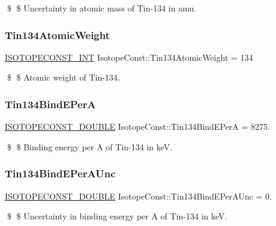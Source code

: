 \$ \$ Uncertainty in atomic mass of Tin-\/134 in amu. \mbox{\label{group___isotope_const-_tin-_sn134_gacfcfd9304071fc2728af19d2c158e5ed}} 
\subsubsection{\texorpdfstring{Tin134\+Atomic\+Weight}{Tin134AtomicWeight}}
{\footnotesize\ttfamily \mbox{\hyperlink{group___isotope_const-_macros_ga5f18360b3e99483a35c32d789e62621c}{I\+S\+O\+T\+O\+P\+E\+C\+O\+N\+S\+T\+\_\+\+I\+NT}} Isotope\+Const\+::\+Tin134\+Atomic\+Weight = 134}

\$ \$ Atomic weight of Tin-\/134. \mbox{\label{group___isotope_const-_tin-_sn134_gae83433bedc83493a04379aaac2d9718a}} 
\subsubsection{\texorpdfstring{Tin134\+Bind\+E\+PerA}{Tin134BindEPerA}}
{\footnotesize\ttfamily \mbox{\hyperlink{group___isotope_const-_macros_ga8f45a7272ce02c0b4c65c44636ed719a}{I\+S\+O\+T\+O\+P\+E\+C\+O\+N\+S\+T\+\_\+\+D\+O\+U\+B\+LE}} Isotope\+Const\+::\+Tin134\+Bind\+E\+PerA = 8275.}

\$ \$ Binding energy per A of Tin-\/134 in keV. \mbox{\label{group___isotope_const-_tin-_sn134_gac34bd6bafd94aa8fcd21242cc8097ba1}} 
\subsubsection{\texorpdfstring{Tin134\+Bind\+E\+Per\+A\+Unc}{Tin134BindEPerAUnc}}
{\footnotesize\ttfamily \mbox{\hyperlink{group___isotope_const-_macros_ga8f45a7272ce02c0b4c65c44636ed719a}{I\+S\+O\+T\+O\+P\+E\+C\+O\+N\+S\+T\+\_\+\+D\+O\+U\+B\+LE}} Isotope\+Const\+::\+Tin134\+Bind\+E\+Per\+A\+Unc = 0.}

\$ \$ Uncertainty in binding energy per A of Tin-\/134 in keV. \mbox{\label{group___isotope_const-_tin-_sn134_ga9f425cbce3c1c4aed70ab8713b84480d}} 
